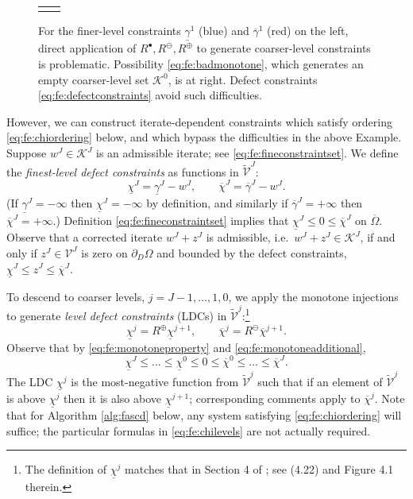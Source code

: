 \documentclass[review,hidelinks,onefignum,onetabnum,final]{siamart220329}  %
\newcommand{\cK}{\mathcal{K}}
\newcommand{\maxR}{R^{\bm{\oplus}}}
\newcommand{\minR}{R^{\bm{\ominus}}}
\newcommand{\iR}{R^{\bullet}}
\begin{document}
\begin{figure}[ht]
\centering
\begin{tabular}{cc}

&

\end{tabular}
\caption{For the finer-level constraints $\underline{\gamma}^1$ (blue) and $\overline{\gamma}^1$ (red) on the left, direct application of $\iR,\minR,\maxR$ to generate coarser-level constraints is problematic.  Possibility \eqref{eq:fe:badmonotone}, which generates an empty coarser-level set $\mathcal{K}^0$, is at right.  Defect constraints \eqref{eq:fe:defectconstraints} avoid such difficulties.}
\label{fig:directRbad}
\end{figure}

However, we can construct iterate-dependent constraints which satisfy ordering \eqref{eq:fe:chiordering} below, and which bypass the difficulties in the above Example.  Suppose $w^J \in \cK^J$ is an admissible iterate; see \eqref{eq:fe:fineconstraintset}.  We define the \emph{finest-level defect constraints} \cite{GraeserKornhuber2009} as functions in $\tilde{\mathcal{V}}^J$:
\begin{equation}
\underline{\chi}^J = \underline{\gamma}^J - w^J, \qquad \overline{\chi}^J = \overline{\gamma}^J - w^J. \label{eq:fe:defectconstraints}
\end{equation}
(If $\underline{\gamma}^J=-\infty$ then $\underline{\chi}^J=-\infty$ by definition, and similarly if $\overline{\gamma}^J=+\infty$ then $\overline{\chi}^J=+\infty$.)  Definition \eqref{eq:fe:fineconstraintset} implies that $\underline{\chi}^J \le 0 \le \overline{\chi}^J$ on $\overline{\Omega}$.    Observe that a corrected iterate $w^J + z^J$ is admissible, i.e.~$w^J + z^J \in \cK^J$, if and only if $z^J \in \mathcal{V}^J$ is zero on $\partial_D\Omega$ and bounded by the defect constraints, $\underline{\chi}^J \le z^J \le \overline{\chi}^J$.

To descend to coarser levels, $j=J-1,\dots,1,0$, we apply the monotone injections to generate \emph{level defect constraints} (LDCs) in $\tilde{\mathcal{V}}^j$:\footnote{The definition of $\underline{\chi}^j$ matches that in Section 4 of \cite{GraeserKornhuber2009}; see (4.22) and Figure 4.1 therein.}
\begin{equation}
\underline{\chi}^{j} = \maxR \underline{\chi}^{j+1}, \qquad \overline{\chi}^{j} = \minR \overline{\chi}^{j+1}. \label{eq:fe:chilevels}
\end{equation}
Observe that by \eqref{eq:fe:monotoneproperty} and \eqref{eq:fe:monotoneadditional},
\begin{equation}
\underline{\chi}^{J} \le \dots \le \underline{\chi}^0 \le 0 \le \overline{\chi}^0 \le \dots \le \overline{\chi}^J. \label{eq:fe:chiordering}
\end{equation}
The LDC $\underline{\chi}^j$ is the most-negative function from $\tilde{\mathcal{V}}^j$ such that if an element of $\tilde{\mathcal{V}}^j$ is above $\underline{\chi}^j$ then it is also above $\underline{\chi}^{j+1}$; corresponding comments apply to $\overline{\chi}^{j}$.  Note that for Algorithm \ref{alg:fascd} below, any system satisfying \eqref{eq:fe:chiordering} will suffice; the particular formulas in \eqref{eq:fe:chilevels} are not actually required.
\end{document}
